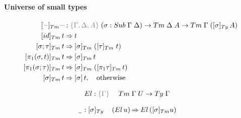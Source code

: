 \documentclass[a4paper,UKenglish,numberwithinsect,cleveref,thm-restate]{lipics-v2021}
\begin{document}
\paragraph*{Universe of small types}
\begin{alignat*}{5}
  [\blank]_{\Tm}\blank            & : \implicit{\Gamma, \Delta, A}\; (\sigma : \Sub\;\Gamma\;\Delta) \to \Tm\;\Delta\;A \to \Tm\;\Gamma\;([\sigma]_{\Ty}\,A) \\ 
 [ \idS ]_{\Tm}\,t                & \reduce t \\
 [ \sigma ; \tau ]_{\Tm}\,t       & \reduce [ \sigma ]_{\Tm}\;([ \tau ]_{\Tm}\;t) \\
 [ \pi_1(\sigma, t) ]_{\Tm}\,t    & \reduce [\sigma]_\Tm\,t \\
 [ \pi_1(\sigma; \tau) ]_{\Tm}\,t & \reduce [\sigma]_\Tm\; ([\pi_1\tau]_\Tm \,t) \\
 [ \sigma ]_{\Tm}\,t              & \reduce [ \sigma ]\,t, \quad \text{otherwise}
\end{alignat*}

\begin{alignat*}{5}
  \El       & : \implicit{\Gamma}\; && \Tm\;\Gamma\;U \to \Ty\;\Gamma
\end{alignat*}

\begin{alignat*}{5}
  \nameless & : [ \sigma ]_{\Ty}\,  && (\El\, u) \reduce \El\,([\sigma]_{\Tm}{u})
\end{alignat*}
\end{document}
